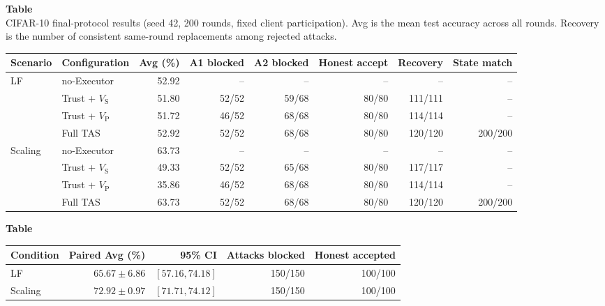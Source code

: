 \noindent\begin{minipage}{\textwidth}
\label{tab:appendix_cifar_final}
\textbf{Table~\thetable}\\
CIFAR-10 final-protocol results (seed 42, 200 rounds, fixed client participation). Avg is the mean test accuracy across all rounds. Recovery is the number of consistent same-round replacements among rejected attacks.
\par\smallskip
\centering\small
\setlength{\tabcolsep}{3pt}
\renewcommand{\arraystretch}{1.15}
\begin{tabular}{llrrrrrr}
\toprule
Scenario & Configuration & Avg (\%) & A1 blocked & A2 blocked & Honest accept & Recovery & State match \\
\midrule
LF & no-Executor & 52.92 & -- & -- & -- & -- & -- \\
 & Trust + $V_{\mathrm{S}}$ & 51.80 & 52/52 & 59/68 & 80/80 & 111/111 & -- \\
 & Trust + $V_{\mathrm{P}}$ & 51.72 & 46/52 & 68/68 & 80/80 & 114/114 & -- \\
 & Full TAS & 52.92 & 52/52 & 68/68 & 80/80 & 120/120 & 200/200 \\
\midrule
Scaling & no-Executor & 63.73 & -- & -- & -- & -- & -- \\
 & Trust + $V_{\mathrm{S}}$ & 49.33 & 52/52 & 65/68 & 80/80 & 117/117 & -- \\
 & Trust + $V_{\mathrm{P}}$ & 35.86 & 46/52 & 68/68 & 80/80 & 114/114 & -- \\
 & Full TAS & 63.73 & 52/52 & 68/68 & 80/80 & 120/120 & 200/200 \\
\bottomrule
\end{tabular}
\end{minipage}

\noindent\begin{minipage}{\textwidth}
\label{tab:tas_five_seed}
\textbf{Table~\thetable}\\
\par\smallskip\centering\small
\setlength{\tabcolsep}{4pt}
\begin{tabular}{lrrrr}
\toprule
Condition & Paired Avg (\%) & 95\% CI & Attacks blocked & Honest accepted \\
\midrule
LF & $65.67\pm6.86$ & $[57.16,74.18]$ & 150/150 & 100/100 \\
Scaling & $72.92\pm0.97$ & $[71.71,74.12]$ & 150/150 & 100/100 \\
\bottomrule
\end{tabular}
\end{minipage}

